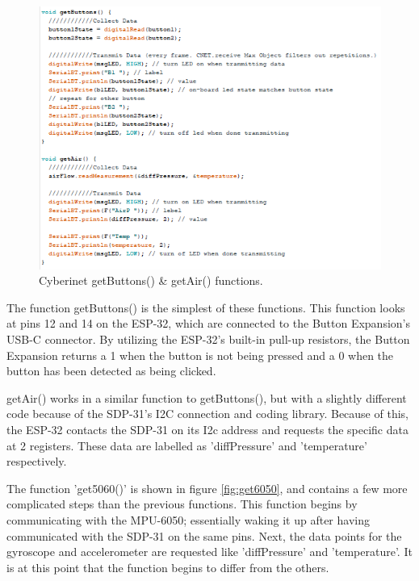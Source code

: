 \begin{center}
    \begin{figure}
        \centering
        \includegraphics[scale=1.5]{diagrams/maxPatches/getbuttonsgetair.png}
        \caption{Cyberinet getButtons() \& getAir() functions.}
        \label{fig:getButtonsGetAir}
    \end{figure}
\end{center}

The function getButtons() is the simplest of these functions. This function looks at pins 12 and 14 on the ESP-32, which are connected to the Button Expansion's USB-C connector. By utilizing the ESP-32's built-in pull-up resistors, the Button Expansion returns a 1 when the button is not being pressed and a 0 when the button has been detected as being clicked.

getAir() works in a similar function to getButtons(), but with a slightly different code because of the SDP-31's I2C connection and coding library. Because of this, the ESP-32 contacts the SDP-31 on its I2c address and requests the specific data at 2 registers. These data are labelled as 'diffPressure' and 'temperature' respectively. 

The function 'get5060()' is shown in figure \ref{fig:get6050}, and contains a few more complicated steps than the previous functions. This function begins by communicating with the MPU-6050; essentially waking it up after having communicated with the SDP-31 on the same pins. Next, the data points for the gyroscope and accelerometer are requested like 'diffPressure' and 'temperature'. It is at this point that the function begins to differ from the others.

